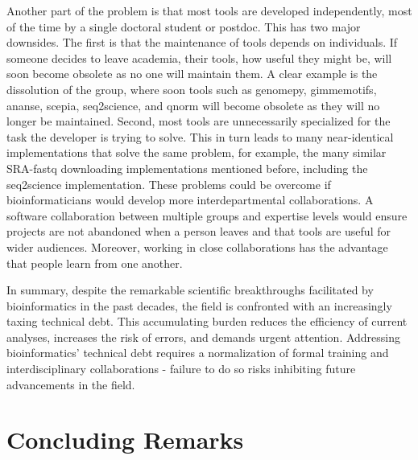Another part of the problem is that most tools are developed independently, most of the time by a single doctoral student or postdoc. This has two major downsides. The first is that the maintenance of tools depends on individuals. If someone decides to leave academia, their tools, how useful they might be, will soon become obsolete as no one will maintain them. A clear example is the dissolution of the  group, where soon tools such as genomepy\cite{genomepy}, gimmemotifs\cite{Bruse_2018}, ananse\cite{Xu_2020}, scepia, seq2science\cite{seq2science}, and qnorm\cite{qnorm} will become obsolete as they will no longer be maintained. Second, most tools are unnecessarily specialized for the task the developer is trying to solve. This in turn leads to many near-identical implementations that solve the same problem, for example, the many similar SRA-fastq downloading implementations mentioned before, including the seq2science implementation. These problems could be overcome if bioinformaticians would develop more interdepartmental collaborations. A software collaboration between multiple groups and expertise levels would ensure projects are not abandoned when a person leaves and that tools are useful for wider audiences. Moreover, working in close collaborations has the advantage that people learn from one another.

In summary, despite the remarkable scientific breakthroughs facilitated by bioinformatics in the past decades, the field is confronted with an increasingly taxing technical debt. This accumulating burden reduces the efficiency of current analyses, increases the risk of errors, and demands urgent attention. Addressing bioinformatics' technical debt requires a normalization of formal training and interdisciplinary collaborations - failure to do so risks inhibiting future advancements in the field.

\section{Concluding Remarks}

